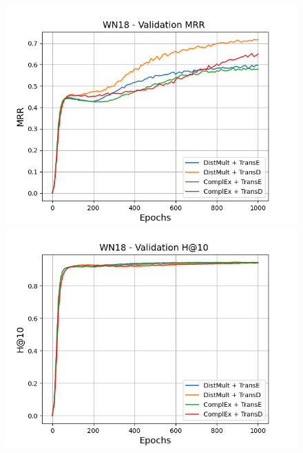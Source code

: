 \begin{figure}[H]
    \centering
    \begin{minipage}{.45\textwidth}
      \centering
      \includegraphics[width=0.9\linewidth]{figures/results/gan_train/not_pretrained/random/wn18/epochs1000/random_wn18_mrrs.png}
    \end{minipage}%
    \begin{minipage}{.45\textwidth}
      \centering
      \includegraphics[width=0.9\linewidth]{figures/results/gan_train/not_pretrained/random/wn18/epochs1000/random_wn18_hit10.png}
    \end{minipage}
    

\end{figure}
